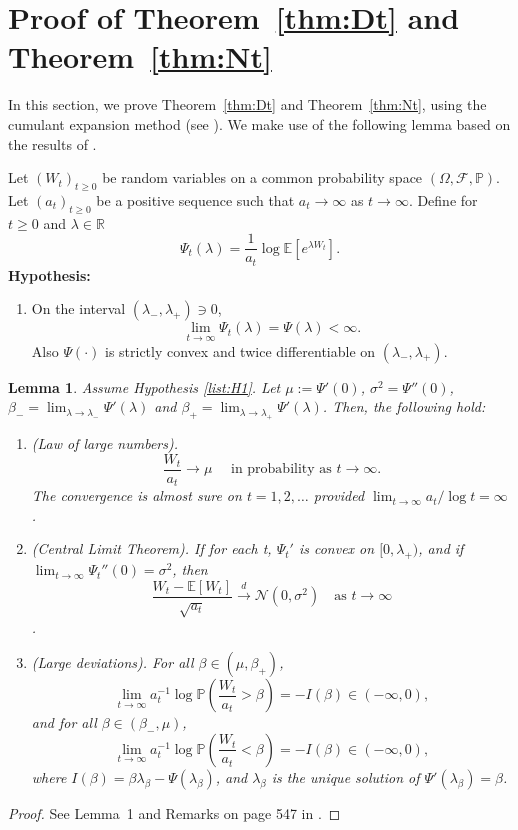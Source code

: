 \documentclass{article}[12pt]
\newtheorem{lemma}{Lemma}[section]
\theoremstyle{definition}
\newcommand{\R}{\mathbb{R}}
\newcommand{\pr}{\mathbb{P}}
\newcommand{\E}{\mathbb{E}}
\newcommand{\1}{\mathbbm{1}}
\begin{document}
\section{Proof of Theorem~\ref{thm:Dt} and Theorem~\ref{thm:Nt}} \label{sec:dtntproof}
In this section, we prove Theorem~\ref{thm:Dt} and Theorem~\ref{thm:Nt}, using the cumulant expansion method (see \cite{CG1984}). We make use of the following lemma based on the results of \cite{S1969,PS1975, S1978}.

Let $(W_t)_{t\ge 0}$ be random variables on a common probability space $(\Omega, \mathcal{F}, \pr)$. Let $(a_t)_{t\ge 0}$ be a positive sequence such that $a_t \to \infty$ as $t\to \infty$. Define for $t\ge 0$ and $\lambda \in \R$
$$\Psi_t(\lambda) = \frac{1}{a_t}\log \E[e^{\lambda W_t}].$$
\textbf{Hypothesis:}
\begin{enumerate}[label= (H\arabic*)]
\item \label{list:H1}
    On the interval $(\lambda_{-}, \lambda_{+})\ni 0$,
    $$\lim_{t\to \infty} \Psi_t(\lambda) = \Psi(\lambda)< \infty.$$
    Also $\Psi(\cdot)$ is strictly convex and twice differentiable on $(\lambda_-, \lambda_+)$. 
\end{enumerate}
\begin{lemma}\label{lm:largedeviations}
Assume Hypothesis {\rm\ref{list:H1}}. Let $\mu := \Psi'(0)$, $\sigma^2 = \Psi''(0)$, $\beta_- = \lim_{\lambda \to \lambda_-}\Psi'(\lambda)$ and $\beta_+ = \lim_{\lambda \to \lambda_+}\Psi'(\lambda)$. Then, the following hold:
\begin{enumerate}
    \item[(a)] (Law of large numbers).
    $$\frac{W_t}{a_t} \to \mu \quad \text{ in probability as } t\to \infty.$$
    The convergence is almost sure on $t=1,2,\ldots$ provided $\lim_{t\to \infty}a_t/\log t = \infty$.
    \item[(b)] (Central Limit Theorem). If for each t, $\Psi_t'$ is convex on $[0,\lambda_+)$, and if $\lim_{t\to \infty}\Psi_t''(0) = \sigma^2$, then $$\frac{W_t - \E[W_t]}{\sqrt{a_t}}\xrightarrow{d}\mathcal{N}(0,\sigma^2)\quad \text{as } t\to \infty$$.
    \item[(c)] (Large deviations). For all $\beta \in (\mu, \beta_+)$, 
    $$\lim_{t\to \infty}a_t^{-1}\log \pr \left(\frac{W_t}{a_t} > \beta\right) = -I(\beta)\in (-\infty,0),$$
    and for all $\beta\in (\beta_-, \mu)$, 
    $$\lim_{t\to \infty}a_t^{-1} \log \pr\left(\frac{W_t}{a_t}<\beta\right) = -I(\beta)\in (-\infty,0),$$
    where $I(\beta) = \beta\lambda_\beta - \Psi(\lambda_\beta)$, and $\lambda_\beta$ is the unique solution of $\Psi'(\lambda_\beta) = \beta$.
\end{enumerate}
\end{lemma}
\begin{proof}
See Lemma~1 and Remarks on page 547 in \cite{CG1984}.
\end{proof}
\end{document}
